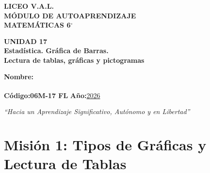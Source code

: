 \documentclass[12pt, letterpaper]{article}
\begin{document}
	
	\begin{center}
		{\Huge\textbf{LICEO V.A.L.}}\\[0.5cm]
		{\LARGE\textbf{MÓDULO DE AUTOAPRENDIZAJE}}\\[0.5cm]
		{\Large\textbf{MATEMÁTICAS 6$^\circ$}}\\[0.5cm]
		\begin{tcolorbox}[colback=valblue!10, colframe=valblue,
			arc=3mm, boxrule=1.5pt]
			\centering
			\Huge\textbf{UNIDAD 17}\\[0.2cm]
			\Large\textbf{Estadística. Gráfica de Barras.}\\[0.1cm]
			\Large\textbf{Lectura de tablas, gráficas y pictogramas}
		\end{tcolorbox}
		\vspace{0.6cm}
		\begin{tcolorbox}[colback=white, colframe=valblue,
			width=12cm, arc=3mm, boxrule=1.5pt]
			\centering\vspace{0.3cm}
			\textbf{Nombre:}\\[0.3cm]
			\underline{\hspace{9cm}}\\[0.5cm]
			\textbf{Código:}\;\textbf{06M-17 FL}
			\hspace{1cm}\textbf{Año:}\;\underline{2026}
			\vspace{0.3cm}
		\end{tcolorbox}
		\vspace{0.8cm}
		\textit{``Hacia un Aprendizaje Significativo, Autónomo y en Libertad''}
	\end{center}
	
	\section*{Misión 1: Tipos de Gráficas y Lectura de Tablas}
	
\end{document}
